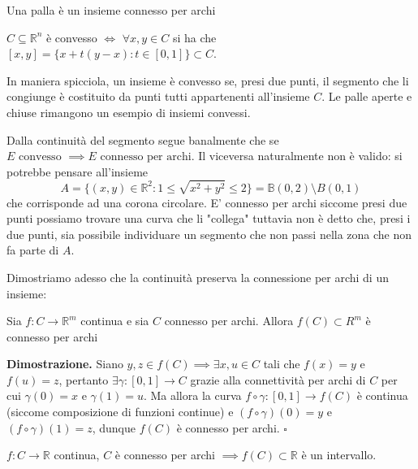 \begin{example}
	Una palla è un insieme connesso per archi
\end{example}

\vspace{0.5cm}
\begin{definition}[\textcolor{blue}{insiemi convessi}]
	$C \subseteq \mathbb{R}^n$ è convesso $\iff \, \, \forall x, y \in C$ si ha che $[x, y] = \{ x + t(y-x) : t \in [0, 1] \} \subset C$.
\end{definition}

\begin{remark}
	In maniera spicciola, un insieme è convesso se, presi due punti, il segmento che li congiunge è costituito da punti tutti appartenenti all'insieme $C$. Le palle aperte e chiuse rimangono un esempio di insiemi convessi.
\end{remark}

\begin{remark}
	Dalla continuità del segmento segue banalmente che se $E \text{ convesso } \implies E \text{ connesso per archi}$. Il viceversa naturalmente non è valido: si potrebbe pensare all'insieme 
	$$
	A = \{(x, y) \in \mathbb{R}^2 : 1 \leq \sqrt{x^2 + y^2} \leq 2 \} = \mathbb{B}(0, 2) \setminus B(0,1)
	$$
	che corrisponde ad una corona circolare. E' connesso per archi siccome presi due punti possiamo trovare una curva che li "collega" tuttavia non è detto che, presi i due punti, sia possibile individuare un segmento che non passi nella zona che non fa parte di $A$.
\end{remark}

\noindent Dimostriamo adesso che la continuità preserva la connessione per archi di un insieme:

\begin{theorem}[\textcolor{blue}{C4}]
	Sia $f: C \to \mathbb{R}^m$ continua e sia $C$ connesso per archi. Allora $f(C) \subset R^m$ è connesso per archi
\end{theorem}

\noindent \textbf{Dimostrazione. }
Siano $y, z \in f(C) \implies \exists x, u \in C$ tali che $f(x) = y$ e $f(u) = z$, pertanto $\exists \gamma : [0,1] \to C$ grazie alla connettività per archi di $C$ per cui $\gamma(0) = x$ e $\gamma(1) = u$. Ma allora la curva $f \circ \gamma: [0,1] \to f(C)$ è continua (siccome composizione di funzioni continue) e $(f \circ \gamma)(0) = y$ e $(f \circ \gamma)(1) = z$, dunque $f(C)$ è connesso per archi.
\hfill $\square$

\vspace{0.5cm}
\begin{cor}
$f: C \to \mathbb{R}$ continua, $C$ è connesso per archi $\implies f(C) \subset \mathbb{R}$ è un intervallo. 
\end{cor}

